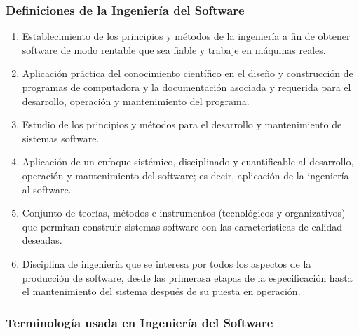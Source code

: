 \documentclass[12pt,spanish]{article}
\begin{document}
\subsubsection{Definiciones de la Ingeniería del Software}

\begin{enumerate}
	\item Establecimiento de los principios y métodos de la ingeniería a fin de obtener software de modo rentable que sea fiable y trabaje en máquinas reales.
	\item Aplicación práctica del conocimiento científico en el diseño y construcción de programas de computadora y la documentación asociada y requerida para el desarrollo, operación y mantenimiento del programa.
	\item Estudio de los principios y métodos para el desarrollo y mantenimiento de sistemas software.
	\item Aplicación de un enfoque sistémico, disciplinado y cuantificable al desarrollo, operación y mantenimiento del software; es decir, aplicación de la ingeniería al software.
	\item Conjunto de teorías, métodos e instrumentos (tecnológicos y organizativos) que permitan construir sistemas software con las características de calidad deseadas.
	\item Disciplina de ingeniería que se interesa por todos los aspectos de la producción de software, desde las primerasa etapas de la especificación hasta el mantenimiento del sistema después de su puesta en operación.
\end{enumerate}

\subsubsection{Terminología usada en Ingeniería del Software}
\end{document}

